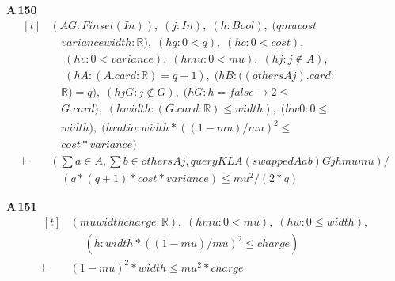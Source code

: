 \noindent\textbf{A\,150}\quad{}
{\footnotesize\[ \begin{aligned}[t]
&(\mathit{A} \mathit{G} : \mathit{Finset} (\mathit{I} \mathit{n})),\; (\mathit{j} : \mathit{I} \mathit{n}),\; (\mathit{h} : \mathit{Bool}),\; (\mathit{q} \mathit{mu} \mathit{cost}\\
&\quad \mathit{variance} \mathit{width} : \mathbb{R} ),\; (\mathit{hq} : 0<\mathit{q}),\; (\mathit{hc} : 0<\mathit{cost}),\\
&\quad \; (\mathit{hv} : 0<\mathit{variance}),\; (\mathit{hmu} : 0 < \mathit{mu}),\; (\mathit{hj} : \mathit{j} \notin \mathit{A}),\\
&\quad \; (\mathit{hA} : (\mathit{A}.\mathit{card}:\mathbb{R} )=\mathit{q}+1),\; (\mathit{hB} : ((\mathit{others} \mathit{A} \mathit{j}).\mathit{card}:\\
&\quad \mathbb{R} )=\mathit{q}),\; (\mathit{hjG} : \mathit{j} \notin \mathit{G}),\; (\mathit{hG} : \mathit{h}=\mathit{false} \to 2 \leq\\
&\quad \mathit{G}.\mathit{card}),\; (\mathit{hwidth} : (\mathit{G}.\mathit{card}:\mathbb{R} ) \leq \mathit{width}),\; (\mathit{hw0} : 0 \leq\\
&\quad \mathit{width}),\; (\mathit{hratio} : \mathit{width}*((1-\mathit{mu})/\mathit{mu})^{2} \leq\\
&\quad \mathit{cost}*\mathit{variance})\\
\vdash\;&(\textstyle\sum \mathit{a} \in \mathit{A},\textstyle\sum \mathit{b} \in \mathit{others} \mathit{A} \mathit{j},\mathit{queryKL} \mathit{A} (\mathit{swapped} \mathit{A} \mathit{a} \mathit{b}) \mathit{G} \mathit{j} \mathit{h} \mathit{mu} \mathit{mu})/\\
&\quad (\mathit{q}*(\mathit{q}+1)*\mathit{cost}*\mathit{variance}) \leq \mathit{mu}^{2}/(2*\mathit{q})
\end{aligned} \]}

\noindent\textbf{A\,151}\quad{}
{\footnotesize\[ \begin{aligned}[t]
&(\mathit{mu} \mathit{width} \mathit{charge} : \mathbb{R} ),\; (\mathit{hmu} : 0 < \mathit{mu}),\; (\mathit{hw} : 0 \leq \mathit{width}),\\
&\quad \; (\mathit{h} : \mathit{width}*((1-\mathit{mu})/\mathit{mu})^{2} \leq \mathit{charge})\\
\vdash\;&(1-\mathit{mu})^{2}*\mathit{width} \leq \mathit{mu}^{2}*\mathit{charge}
\end{aligned} \]}

